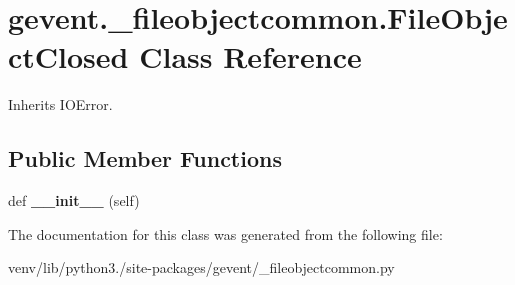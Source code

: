 \hypertarget{classgevent_1_1__fileobjectcommon_1_1_file_object_closed}{}\section{gevent.\+\_\+fileobjectcommon.\+File\+Object\+Closed Class Reference}
\label{classgevent_1_1__fileobjectcommon_1_1_file_object_closed}


Inherits I\+O\+Error.

\subsection*{Public Member Functions}
\begin{DoxyCompactItemize}
\item 
\mbox{\label{classgevent_1_1__fileobjectcommon_1_1_file_object_closed_a2ddd1bb316bf18e77f7402b8749f3d0d}} 
def {\bfseries \+\_\+\+\_\+init\+\_\+\+\_\+} (self)
\end{DoxyCompactItemize}


The documentation for this class was generated from the following file\+:\begin{DoxyCompactItemize}
\item 
venv/lib/python3./site-\/packages/gevent/\+\_\+fileobjectcommon.\+py\end{DoxyCompactItemize}

